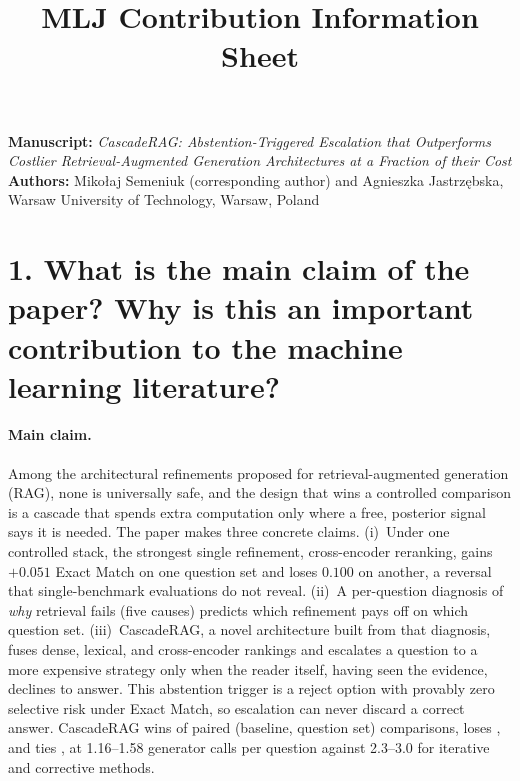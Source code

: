 \documentclass[10pt,a4paper]{article}
\title{MLJ Contribution Information Sheet}
\author{}
\date{}
\begin{document}
\maketitle
\vspace{-3em}
\noindent\textbf{Manuscript:} \emph{CascadeRAG: Abstention-Triggered
Escalation that Outperforms Costlier Retrieval-Augmented Generation
Architectures at a Fraction of their Cost}\\
\textbf{Authors:} Miko{\l}aj Semeniuk (corresponding author) and Agnieszka
Jastrz{\k{e}}bska, Warsaw University of Technology, Warsaw, Poland

\section*{1. What is the main claim of the paper? Why is this an important
contribution to the machine learning literature?}

\paragraph{Main claim.} Among the architectural refinements proposed for
retrieval-augmented generation (RAG), none is universally safe, and the
design that wins a controlled comparison is a cascade that spends extra
computation only where a free, posterior signal says it is needed. The
paper makes three concrete claims. (i)~Under one controlled stack, the
strongest single refinement, cross-encoder reranking, gains $+0.051$ Exact
Match on one question set and loses $0.100$ on another, a reversal that
single-benchmark evaluations do not reveal. (ii)~A per-question diagnosis
of \emph{why} retrieval fails (five causes) predicts which refinement pays
off on which question set. (iii)~CascadeRAG, a novel architecture built
from that diagnosis, fuses dense, lexical, and cross-encoder rankings and
escalates a question to a more expensive strategy only when the reader
itself, having seen the evidence, declines to answer. This abstention
trigger is a reject option with provably zero selective risk under Exact
Match, so escalation can never discard a correct answer. CascadeRAG wins
\ResultWins{} of \ResultPairs{} paired (baseline, question set)
comparisons, loses \ResultLosses{}, and ties \ResultTies{}, at 1.16--1.58
generator calls per question against 2.3--3.0 for iterative and corrective
methods.
\end{document}

